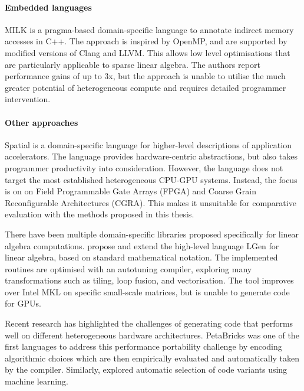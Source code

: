     \paragraph*{Embedded languages}
    MILK \citep{Kiriansky:2016:OIM:2967938.2967948} is a pragma-based
    domain-specific language to annotate indirect memory accesses in C++.
    The approach is inspired by OpenMP, and are supported by modified versions
    of Clang and LLVM.
    This allows low level optimisations that are particularly applicable to
    sparse linear algebra.
    The authors report performance gains of up to 3x, but the approach is unable
    to utilise the much greater potential of heterogeneous compute and requires
    detailed programmer intervention.

    \paragraph*{Other approaches}
    Spatial \citep{Koeplinger:2018:SLC:3192366.3192379} is a domain-specific
    language for higher-level descriptions of application accelerators.
    The language provides hardware-centric abstractions, but also takes
    programmer productivity into consideration.
    However, the language does not target the most established heterogeneous
    CPU-GPU systems.
    Instead, the focus is on on Field Programmable Gate Arrays (FPGA) and
    Coarse Grain Reconfigurable Architectures (CGRA).
    This makes it unsuitable for comparative evaluation with the methods
    proposed in this thesis.

    There have been multiple domain-specific libraries proposed specifically
    for linear algebra computations.
    \citet{Spampinato:2014:BLA:2581122.2544155,
    Spampinato:2016:BLA:2854038.2854060} propose and extend the high-level
    language LGen for linear algebra, based on standard mathematical notation.
    The implemented routines are optimised with an autotuning compiler,
    exploring many transformations such as tiling, loop fusion, and
    vectorisation.
    The tool improves over Intel MKL on specific small-scale matrices, but is
    unable to generate code for GPUs.

    Recent research has highlighted the challenges of generating code that
    performs well on different heterogeneous hardware architectures.
    PetaBricks \citep{Ansel:2009:PLC:1542476.1542481,PhothilimthanaARA13} was
    one of the first languages to address this performance portability challenge
    by encoding algorithmic choices which are then empirically evaluated and
    automatically taken by the
    compiler.
    Similarly, \citet{MuralidharanRHG16} explored automatic selection of code
    variants using machine learning.

